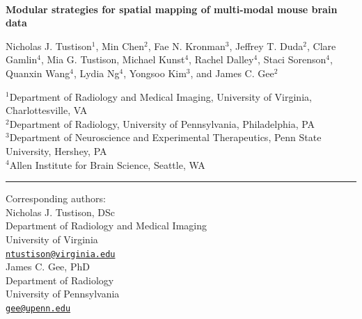 \documentclass[
  12pt,
]{article}
\author{}
\date{\vspace{-2.5em}}
\begin{document}
\linenumbers
{}


\begin{centering}

$ $

\vspace{6cm}

\LARGE

{\bf Modular strategies for spatial mapping of multi-modal mouse brain data}

\vspace{1.0 cm}

\normalsize

Nicholas J. Tustison$^{1}$,
Min Chen$^{2}$,
Fae N. Kronman$^{3}$,
Jeffrey T. Duda$^{2}$,
Clare Gamlin$^{4}$,
Mia G. Tustison,
Michael Kunst$^{4}$,
Rachel Dalley$^{4}$,
Staci Sorenson$^{4}$,
Quanxin Wang$^{4}$,
Lydia Ng$^{4}$,
Yongsoo Kim$^{3}$, and
James C. Gee$^{2}$

\small

$^{1}$Department of Radiology and Medical Imaging, University of Virginia, Charlottesville, VA \\
$^{2}$Department of Radiology, University of Pennsylvania, Philadelphia, PA \\
$^{3}$Department of Neuroscience and Experimental Therapeutics, Penn State University, Hershey, PA \\
$^{4}$Allen Institute for Brain Science, Seattle, WA \\

\end{centering}

\vspace{3.5 cm}

\noindent

\rule{4cm}{0.4pt}

\scriptsize

Corresponding authors:\\

Nicholas J. Tustison, DSc\\
Department of Radiology and Medical Imaging\\
University of Virginia\\
\href{mailto:ntustison@virginia.edu}{\nolinkurl{ntustison@virginia.edu}}\\

James C. Gee, PhD\\
Department of Radiology\\
University of Pennsylvania\\
\href{mailto:gee@upenn.edu}{\nolinkurl{gee@upenn.edu}}
\end{document}
